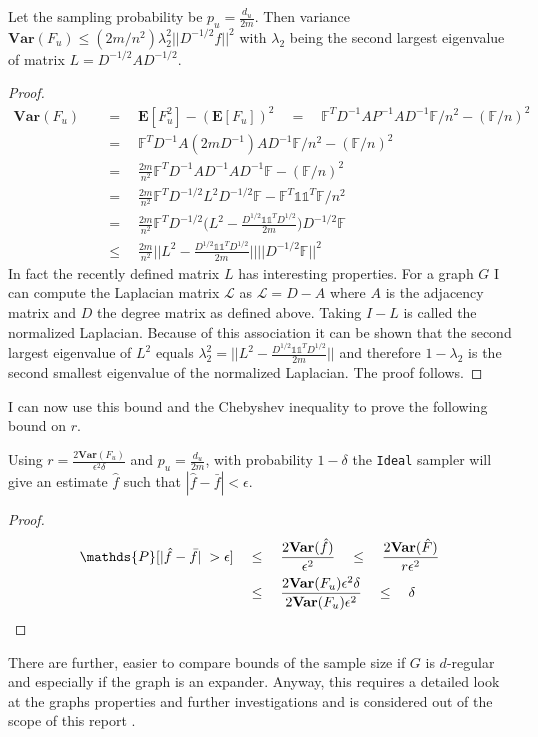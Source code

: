 \begin{lemma}
  Let the sampling probability be $p_u = \frac{d_u}{2m}$. Then variance $\textbf{Var}(F_u) \leq (2m/n^2)\lambda_2^2||D^{-1/2}f||^2$ with $\lambda_2$ being the second largest eigenvalue of matrix $L = D^{-1/2}AD^{-1/2}$. 
\end{lemma}
\begin{proof}
\begin{align*}
\textbf{Var}(F_u) \quad&=\quad \textbf{E}[F_u^2] - (\textbf{E}[F_u])^2 \quad=\quad \mathds{F}^TD^{-1}AP^{-1}AD^{-1}\mathds{F}/n^2 - (\mathds{F}/n)^2 \\
&=\quad \mathds{F}^TD^{-1}A(2mD^{-1})AD^{-1}\mathds{F}/n^2 - (\mathds{F}/n)^2\\
&=\quad \frac{2m}{n^2}\mathds{F}^TD^{-1}AD^{-1}AD^{-1}\mathds{F} - (\mathds{F}/n)^2\\
&=\quad \frac{2m}{n^2}\mathds{F}^TD^{-1/2}L^2D^{-1/2}\mathds{F}-\mathds{F}^T\mathds{1}\mathds{1}^T\mathds{F}/n^2\\
&=\quad \frac{2m}{n^2}\mathds{F}^TD^{-1/2}\bigg(L^2-\frac{D^{1/2}\mathds{1}\mathds{1}^TD^{1/2}}{2m}\bigg)D^{-1/2}\mathds{F}\\
&\leq\quad \frac{2m}{n^2}\bigg|\bigg|L^2 - \frac{D^{1/2}\mathds{1}\mathds{1}^TD^{1/2}}{2m}\bigg|\bigg|||D^{-1/2}\mathds{F}||^2
\end{align*}
In fact the recently defined matrix $L$ has interesting properties. For a graph $G$ I can compute the Laplacian matrix $\mathcal{L}$ as $\mathcal{L} = D - A$ where $A$ is the adjacency matrix and $D$ the degree matrix as defined above.
Taking $I-L$ is called the normalized Laplacian. Because of this association it can be shown that the second largest eigenvalue of $L^2$ equals $\lambda_2^2 = ||L^2 - \frac{D^{1/2}\mathds{1}\mathds{1}^TD^{1/2}}{2m}||$ and therefore $1-\lambda_2$ is the second smallest eigenvalue of the normalized Laplacian. The proof follows.
\end{proof}

I can now use this bound and the Chebyshev inequality to prove the following bound on $r$.
\begin{theorem}
Using $r = \frac{2\textbf{Var}(F_u)}{\epsilon^2\delta}$ and $p_u = \frac{d_u}{2m}$, with probability $1-\delta$ the \texttt{Ideal} sampler will give an estimate $\hat{f}$ such that $|\hat{f}-\bar{f}|< \epsilon$.  
\end{theorem}
\begin{proof}
\begin{align*}
\mathds{P}[|\hat{f}-\bar{f}|\;>\epsilon] \quad&\leq\quad \frac{2\textbf{Var}(\hat{f})}{\epsilon^2} \quad\leq\quad \frac{2\textbf{Var}(\hat{F})}{r\epsilon^2} \\
&\leq\quad \frac{2\textbf{Var}(F_u)\epsilon^2\delta}{2\textbf{Var}(F_u)\epsilon^2} \quad\leq\quad \delta \qedhere
\end{align*}
\end{proof}
There are further, easier to compare bounds of the sample size if $G$ is $d$-regular and especially if the graph is an expander. Anyway, this requires a detailed look at the graphs properties and further investigations and is considered out of the scope of this report \cite{alon1986eigenvalues}.
